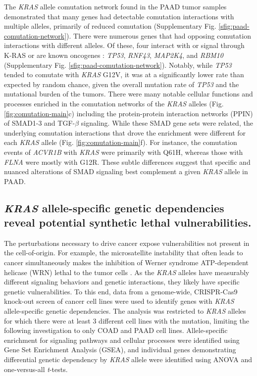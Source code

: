 \documentclass[english, 10pt, letterpaper]{article}
\newcommand{\KRAS}{\emph{KRAS}}
\newcommand{\kras}{K-RAS}
\begin{document}
The \KRAS{} allele comutation network found in the PAAD tumor samples demonstrated that many genes had detectable comutation interactions with multiple alleles, primarily of reduced comutation (Supplementary Fig. \ref{sfig:paad-comutation-network}).
There were numerous genes that had opposing comutation interactions with different alleles.
Of these, four interact with or signal through \kras{} \cite{Kovalski2019, Kanehisa2017, Kanehisa2016KEGGAnnotation.} or are known oncogenes \cite{Bamford2004TheWebsite., Sondka2018}: \emph{TP53}, \emph{RNF43}, \emph{MAP2K4}, and \emph{RBM10} (Supplementary Fig. \ref{sfig:paad-comutation-network}).
Notably, while \emph{TP53} tended to comutate with \KRAS{} G12V, it was at a significantly lower rate than expected by random chance, given the overall mutation rate of \emph{TP53} and the mutational burden of the tumors.
There were many notable cellular functions and processes enriched in the comutation networks of the \KRAS{} alleles (Fig. \ref{fig:comutation-main}c) including the protein-protein interaction networks (PPIN) of SMAD1-3 and TGF-$\beta$ signaling.
While these SMAD gene sets were related, the underlying comutation interactions that drove the enrichment were different for each \KRAS{} allele (Fig. \ref{fig:comutation-main}f).
For instance, the comutation events of \emph{ACVR1B} with \KRAS{} were primarily with Q61H, whereas those with \emph{FLNA} were mostly with G12R.
These subtle differences suggest that specific and nuanced alterations of SMAD signaling best complement a given \KRAS{} allele in PAAD.


\subsection*{\KRAS{} allele-specific genetic dependencies reveal potential synthetic lethal vulnerabilities.}

The perturbations necessary to drive cancer expose vulnerabilities not present in the cell-of-origin.
For example, the microsatellite instability that often leads to cancer simultaneously makes the inhibition of Werner syndrome ATP-dependent helicase (WRN) lethal to the tumor cells \cite{Behan2019, Chan2019}.
As the \KRAS{} alleles have measurably different signaling behaviors and genetic interactions, they likely have specific genetic vulnerabilities.
To this end, data from a genome-wide, CRISPR-Cas9 knock-out screen of cancer cell lines \cite{Tsherniak2017, Meyers2017} were used to identify genes with \KRAS{} allele-specific genetic dependencies.
The analysis was restricted to \KRAS{} alleles for which there were at least 3 different cell lines with the mutation, limiting the following investigation to only COAD and PAAD cell lines.
Allele-specific enrichment for signaling pathways and cellular processes were identified using Gene Set Enrichment Analysis (GSEA), and individual genes demonstrating differential genetic dependency by \KRAS{} allele were identified using ANOVA and one-versus-all \emph{t}-tests.
\end{document}
